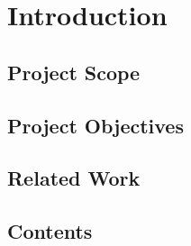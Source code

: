 
\chapter{Introduction}
\label{chapter:intro}

\section{Project Scope}
\label{sec:intro:scope}

\section{Project Objectives}
\label{sec:intro:objectives}

\section{Related Work}
\label{sec:intro:related}

\section{Contents}
\label{sec:intro:contents}
